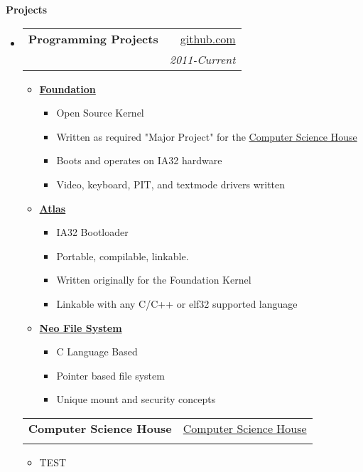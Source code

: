 \documentclass[letterpaper,11pt]{article}
\makeatletter
\newcommand{\resitem}[1]{\item #1 \vspace{-2pt}}
\newcommand{\resheading}[1]{{\large \colorbox{mygrey}{\begin{minipage}{\textwidth}{\textbf{#1 \vphantom{p\^{E}}}}\end{minipage}}}}
\newcommand{\ressubheading}[4]{
\begin{tabular*}{6.5in}{l@{\extracolsep{\fill}}r}
		\textbf{#1} & #2 \\
		\textit{#3} & \textit{#4} \\
\end{tabular*}\vspace{-6pt}}
\makeatother
\begin{document}
\resheading{Projects}
	\begin{itemize}
		\item
			\ressubheading{{Programming Projects}}{\href{http://github.com/WillDignazio}{github.com}}{{} {}}{2011-Current}
				{ \footnotesize
				\begin{itemize}
					\resitem{\href{http://www.github.com/WillDignazio/Foundation/}{\textbf{Foundation}}
						\begin{itemize}
							\item{Open Source Kernel}}
							\item{Written as required "Major Project" for the {\href{http://csh.rit.edu/}{Computer Science House}}}
							\item{Boots and operates on IA32 hardware}
							\item{Video, keyboard, PIT, and textmode drivers written}
						\end{itemize}
					\resitem{\textbf{\href{http://www.github.com/WillDignazio/Atlas/}{Atlas}}}
						\begin{itemize}
							\item{IA32 Bootloader} 
							\item{Portable, compilable, linkable.} 
							\item{Written originally for the Foundation Kernel}
							\item{Linkable with any C/C++ or elf32 supported language}
						\end{itemize}
					\resitem{\textbf{\href{http://www.github.com/WillDignazio/Neo/}{\textbf{Neo File System}}}}									
					\begin{itemize}
						\item{C Language Based}
						\item{Pointer based file system}
						\item{Unique mount and security concepts}
					\end{itemize}
				\end{itemize}	
				}
			\ressubheading{{Computer Science House}}{\href{http://csh.rit.edu/}{Computer Science House}}{}{}
				{ \footnotesize
				\begin{itemize}
					\item{TEST}
				\end{itemize}	
				}
	\end{itemize}

\end{document}
